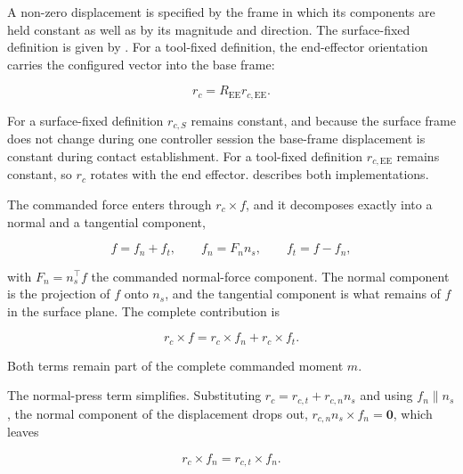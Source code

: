 A non-zero displacement is specified by the frame in which its components are
held constant as well as by its magnitude and direction. The surface-fixed
definition is given by \mbox{}. For a tool-fixed
definition, the end-effector orientation carries the configured vector into
the base frame:

\begin{equation}
r_c=R_{\mathrm{EE}}r_{c,\mathrm{EE}}.
\label{eq:coc_tool_fixed_definition}
\end{equation}

For a surface-fixed definition \mbox{\(r_{c,S}\)} remains constant, and
because the surface frame does not change during one controller session the base-frame
displacement is constant during contact establishment. For a tool-fixed definition
\mbox{\(r_{c,\mathrm{EE}}\)} remains constant, so
\mbox{\(r_c\)} rotates with the end effector.
\mbox{} describes both
implementations.

The commanded force enters through \mbox{\(r_c\times f\)}, and
it decomposes exactly into a normal and a tangential component,

\begin{equation}
f=f_n+f_t,
\qquad
f_n=F_n n_s,
\qquad
f_t=f-f_n,
\label{eq:commanded_force_normal_split}
\end{equation}

with \mbox{\(F_n=n_s^\top f\)} the commanded normal-force component. The normal
component is the projection of \mbox{\(f\)} onto \mbox{\(n_s\)}, and the
tangential component is what remains of \mbox{\(f\)} in the surface plane. The
complete  contribution is

\begin{equation}
r_c\times f
=
r_c\times f_n
+
r_c\times f_t.
\label{eq:coc_moment_normal_tangential}
\end{equation}

Both terms remain part of the complete commanded moment \mbox{\(m\)}.

The normal-press term simplifies. Substituting
\mbox{\(r_c=r_{c,t}+r_{c,n}n_s\)} and using
\mbox{\(f_n\parallel n_s\)}, the normal component of the displacement drops
out, \mbox{\(r_{c,n}n_s\times f_n=\mathbf{0}\)}, which leaves

\begin{equation}
r_c\times f_n
=
r_{c,t}\times f_n.
\label{eq:coc_normal_press_tangential_only}
\end{equation}

